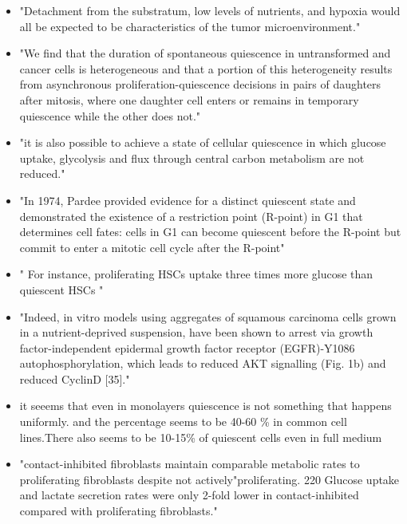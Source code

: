 \documentclass[11pt,a4paper]{article}
\begin{document}
\begin{itemize}
\item "Detachment from the substratum, low levels of nutrients, and hypoxia would all be expected to be characteristics of the tumor microenvironment."\cite{Valcourt2012}

\item  "We find that the duration of spontaneous quiescence in untransformed and cancer cells is heterogeneous and that a portion of this heterogeneity results from asynchronous proliferation-quiescence decisions in pairs of daughters after mitosis, where one daughter cell enters or remains in temporary quiescence while the other does not."\cite{Pulianmackal2021}

\item "it is also possible to achieve a state of cellular quiescence in which glucose uptake, glycolysis and flux through central carbon metabolism are not reduced."\cite{Valcourt2012}

\item "In 1974, Pardee provided evidence for a distinct quiescent state and demonstrated the existence of a restriction point (R-point) in G1 that determines cell fates: cells in G1 can become quiescent before the R-point but commit to enter a mitotic cell cycle after the R-point"\cite{Cheung2013}

\item " For instance, proliferating HSCs uptake three times more glucose than quiescent HSCs " \cite{Marescal2020}

\item "Indeed, in vitro models using aggregates of squamous carcinoma cells grown in a nutrient-deprived suspension, have been shown to arrest via growth factor-independent epidermal growth factor receptor (EGFR)-Y1086 autophosphorylation, which leads to reduced AKT signalling (Fig. 1b) and reduced CyclinD [35]."

\item it seeems that even in monolayers quiescence is not something that happens uniformly. and the percentage seems to be 40-60 \% in common cell lines.There also seems to be 10-15\% of quiescent cells even in full medium \cite{Wang022018}\cite{Hu2011}\cite{Nabil2021}\cite{Koshiji2004}

\item "contact-inhibited fibroblasts maintain comparable metabolic rates to proliferating fibroblasts despite not actively"proliferating. 220 Glucose uptake and lactate secretion rates were only 2-fold lower in contact-inhibited compared with proliferating fibroblasts."\cite{Valcourt2012}


\end{itemize}
\end{document}
